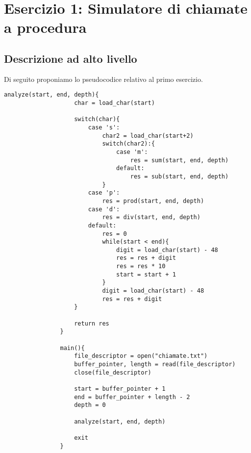 \section*{Esercizio 1: Simulatore di chiamate a procedura}

	\subsection*{Descrizione ad alto livello}
	
		Di seguito proponiamo lo pseudocodice relativo al primo esercizio.
		
        \begin{center}
           	\begin{lstlisting}[language=pseudo, gobble=14]
                analyze(start, end, depth){
                    char = load_char(start)
    	           	
                    switch(char){
                        case 's':
                            char2 = load_char(start+2)
                            switch(char2):{
                                case 'm':
                                    res = sum(start, end, depth)
                                default:
                                    res = sub(start, end, depth)
                            }
                        case 'p':
                            res = prod(start, end, depth)
                        case 'd':
                            res = div(start, end, depth)
                        default:
                            res = 0
                            while(start < end){
                                digit = load_char(start) - 48
                                res = res + digit
                                res = res * 10
                                start = start + 1
                            }
                            digit = load_char(start) - 48
                            res = res + digit
                    }
                    
                    return res
                }
               	
                main(){
                    file_descriptor = open("chiamate.txt")
                    buffer_pointer, length = read(file_descriptor)
                    close(file_descriptor)
    	           	
                    start = buffer_pointer + 1
                    end = buffer_pointer + length - 2
                    depth = 0
    	           	
                    analyze(start, end, depth)
    	           	
                    exit
                }
           	\end{lstlisting}
        \end{center}
		
		